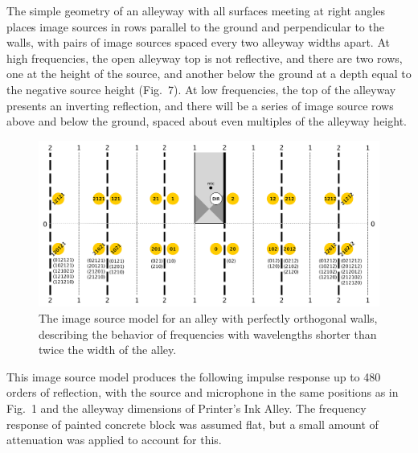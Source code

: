 \documentclass{aes137}
\begin{document}
The simple geometry of an alleyway with all surfaces meeting at right
angles places image sources in rows parallel to the ground and
perpendicular to the walls, with pairs of image sources spaced every
two alleyway widths apart. At high frequencies, the open alleyway top
is not reflective, and there are two rows, one at the height of the
source, and another below the ground at a depth equal to the negative
source height (Fig.~7). At low frequencies, the top of the alleyway
presents an inverting reflection, and there will be a series of image
source rows above and below the ground, spaced about even multiples of
the alleyway height.

\begin{figure}[h!] \centering \includegraphics[width=\linewidth]{images/ISM_uncanted.pdf} 
\caption{The image source model for an alley with perfectly orthogonal walls, describing the behavior of frequencies with wavelengths shorter than twice the width of the alley.} 
\end{figure}

This image source model produces the following impulse response up to 480 orders of reflection, with the source and microphone in the same positions as in Fig.~1 and the alleyway dimensions of Printer's Ink Alley. The frequency response of painted concrete block was assumed flat, but a small amount of attenuation was applied to account for this.
\end{document}
